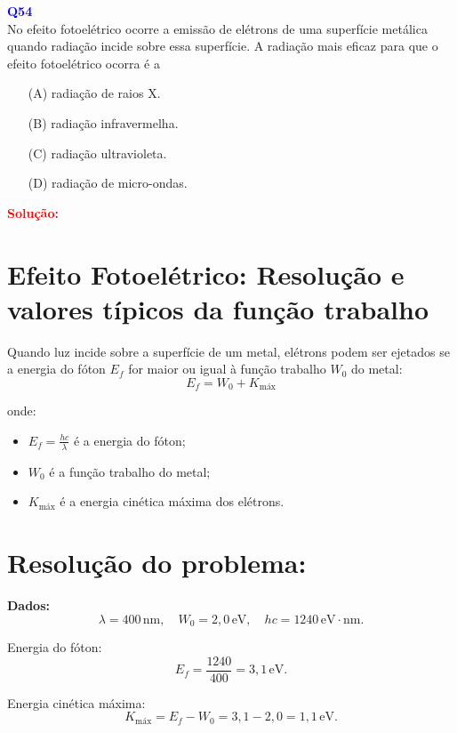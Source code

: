 \documentclass[a4paper,12pt]{article}
\begin{document}
\begin{flushleft}
\textbf{\textcolor{blue}{\Large Q54}}\\
\noindent
No efeito fotoelétrico ocorre a emissão de elétrons de uma
superfície metálica quando radiação incide sobre essa
superfície. A radiação mais eficaz para que o efeito
fotoelétrico ocorra é a

\begin{itemize}
\item[(A)] radiação de raios X.
\item[(B)] radiação infravermelha.
\item[(C)] radiação ultravioleta.
\item[(D)] radiação de micro-ondas.
\end{itemize}

\vspace{0.5cm}

\textcolor{red}{\textbf{Solução:}}\\

\section*{Efeito Fotoelétrico: Resolução e valores típicos da função trabalho}

Quando luz incide sobre a superfície de um metal, elétrons podem ser ejetados se a energia do fóton \( E_f \) for maior ou igual à função trabalho \( W_0 \) do metal:
\[
E_f = W_0 + K_{\text{máx}}
\]

onde:
\begin{itemize}
    \item \( E_f = \frac{hc}{\lambda} \) é a energia do fóton;
    \item \( W_0 \) é a função trabalho do metal;
    \item \( K_{\text{máx}} \) é a energia cinética máxima dos elétrons.
\end{itemize}

\section*{Resolução do problema:}

\textbf{Dados:}
\[
\lambda = 400\,\mathrm{nm}, \quad W_0 = 2{,}0\,\mathrm{eV}, \quad hc = 1240\,\mathrm{eV\cdot nm}.
\]

Energia do fóton:
\[
E_f = \frac{1240}{400} = 3{,}1\,\mathrm{eV}.
\]

Energia cinética máxima:
\[
K_{\text{máx}} = E_f - W_0 = 3{,}1 - 2{,}0 = 1{,}1\,\mathrm{eV}.
\]


\end{flushleft}
\end{document}
